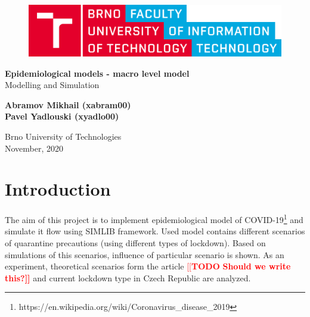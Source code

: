 \documentclass[12pt,a4paper]{article}
\newcommand{\todo}[1]{\textcolor{red}{[[\textbf{TODO} \textbf{#1]]}}}
\begin{document}
    \begin{titlepage}
        \begin{center}
            \vspace*{1cm}
        
            \begin{figure}[h!]
                \includegraphics[scale=0.12]{VUT-FIT-logo-en.png}
            \end{figure}
            \vspace{1.5cm}

            \Large{\textbf{Epidemiological models - macro level model}} \\
            \large{Modelling and Simulation}

            \vspace{0.5cm}
                
            \vspace{1.5cm}
            
            \textbf{Abramov Mikhail (xabram00)} \\
            \textbf{Pavel Yadlouski (xyadlo00)} 

            \vfill
                
            \vspace{0.8cm}
        
            Brno University of Technologies\\
            November, 2020
                
        \end{center}
    \end{titlepage}

    \tableofcontents
    \newpage

    \section{Introduction}
    The aim of this project is to implement epidemiological model of COVID-19\footnote{https://en.wikipedia.org/wiki/Coronavirus\_disease\_2019}
    and simulate it flow using SIMLIB framework\cite{SIMLIB}. 
    Used model contains different scenarios of quarantine precautions (using different types of lockdown).
    Based on simulations of this scenarios, influence of particular scenario is shown. 
    As an experiment, theoretical scenarios form the article \todo{Should we write this?} and current lockdown type in Czech Republic are analyzed.
\end{document}
